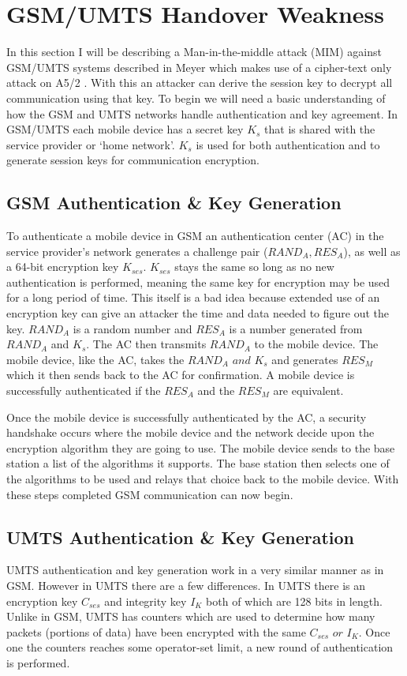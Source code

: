 \documentclass{sig-alternate}
\begin{document}
\section{GSM/UMTS Handover Weakness }

	In this section I  will be describing a Man-in-the-middle attack (MIM) against GSM/UMTS systems described in Meyer \cite{Meyer:2004} which makes use of a cipher-text only attack on A5/2 \cite{Barkan}. With this an attacker can derive the session key to decrypt all communication using that key. To begin we will need a basic understanding of how the GSM and UMTS networks handle authentication and key agreement. In GSM/UMTS each mobile device has a secret key $K_{s}$ that is shared with the service provider or `home network'. $K_{s}$ is used for both authentication and to generate session keys for communication encryption.     
	\subsection{GSM Authentication \& Key Generation} 
		To authenticate a mobile device in GSM an authentication center (AC) in the service provider's network generates a challenge pair ($\mathit{RAND_{A},RES_{A}}$), as well as a 64-bit encryption key  $K_{ses}$.  $K_{ses}$ stays the same so long as no new authentication is performed, meaning the same key for encryption may be used for a long period of time. This itself is a bad idea because extended use of an encryption key can give an attacker the time and data needed to figure out the key. $\mathit{RAND_{A}}$ is a random number and $\mathit{RES_{A}}$ is a number generated from $\mathit{RAND_{A}}$ and $K_{s}$. The AC then transmits $\mathit{RAND_{A}}$ to the mobile device. The mobile device, like the AC, takes the $\mathit{RAND_{A} \text{ and } K_{s}}$ and generates $\mathit{RES_{M}}$ which it then sends back to the AC for confirmation. A mobile device is successfully authenticated if the $\mathit{RES_{A}}$ and the $\mathit{RES_{M}}$ are equivalent.
		
	 Once the mobile device is successfully authenticated by the AC, a security handshake occurs where the mobile device and the network decide upon the encryption algorithm they are going to use. The mobile device sends to the base station a list of the algorithms it supports. The base station then selects one of the algorithms to be used and relays that choice back to the mobile device. With these steps completed GSM communication can now begin.
		
	\subsection{UMTS Authentication \& Key Generation \label{UMTS:Auth}} 
		UMTS authentication and key generation work in a very similar manner as in GSM. However in UMTS there are a few differences. In UMTS there is an encryption key $C_{ses}$ and integrity key $I_{K}$ both of which are 128 bits in length. Unlike in GSM, UMTS has counters which are used to determine how many packets (portions of data) have been encrypted with the same $\mathit{C_{ses} \text{ or } I_{K}}$. Once one the counters reaches some operator-set limit, a new round of authentication is performed.
		
\end{document}
